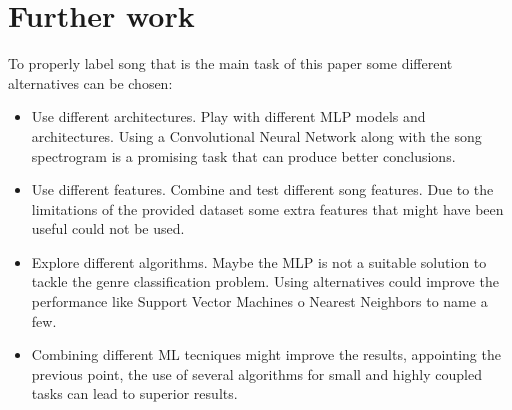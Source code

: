 \section{Further work}
To properly label song that is the main task of this paper some different alternatives can be chosen:

\begin{itemize}
	\item Use different architectures. Play with different MLP models and architectures. Using a Convolutional Neural Network along with the song spectrogram is a promising task that can produce better conclusions.
	\item Use different features. Combine and test different song features. Due to the limitations of the provided dataset some extra features that might have been useful could not be used.
	\item Explore different algorithms. Maybe the MLP is not a suitable solution to tackle the genre classification problem. Using alternatives could improve the performance like Support Vector Machines o Nearest Neighbors to name a few.
	\item Combining different ML tecniques might improve the results, appointing the previous point, the use of several algorithms for small and highly coupled tasks can lead to superior results.
\end{itemize}
